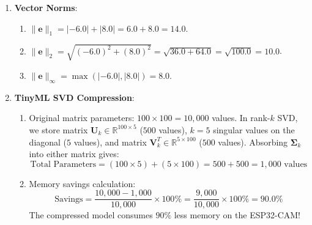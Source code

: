 \begin{enumerate}
    \item \textbf{Vector Norms}:
    \begin{enumerate}
        \item $\|\mathbf{e}\|_1 = |-6.0| + |8.0| = 6.0 + 8.0 = 14.0$.
        \item $\|\mathbf{e}\|_2 = \sqrt{(-6.0)^2 + (8.0)^2} = \sqrt{36.0 + 64.0} = \sqrt{100.0} = 10.0$.
        \item $\|\mathbf{e}\|_\infty = \max(|-6.0|, |8.0|) = 8.0$.
    \end{enumerate}

    \item \textbf{TinyML SVD Compression}:
    \begin{enumerate}
        \item Original matrix parameters: $100 \times 100 = 10{,}000$ values.
        In rank-$k$ SVD, we store matrix $\mathbf{U}_k \in \mathbb{R}^{100 \times 5}$ ($500$ values), $k=5$ singular values on the diagonal ($5$ values), and matrix $\mathbf{V}_k^T \in \mathbb{R}^{5 \times 100}$ ($500$ values).
        Absorbing $\mathbf{\Sigma}_k$ into either matrix gives:
        \begin{equation*}
        \text{Total Parameters} = (100 \times 5) + (5 \times 100) = 500 + 500 = 1{,}000 \text{ values}
        \end{equation*}
        \item Memory savings calculation:
        \begin{equation*}
        \text{Savings} = \frac{10{,}000 - 1{,}000}{10{,}000} \times 100\% = \frac{9{,}000}{10{,}000} \times 100\% = 90.0\%
        \end{equation*}
        The compressed model consumes $90\%$ less memory on the ESP32-CAM!
    \end{enumerate}
\end{enumerate}
